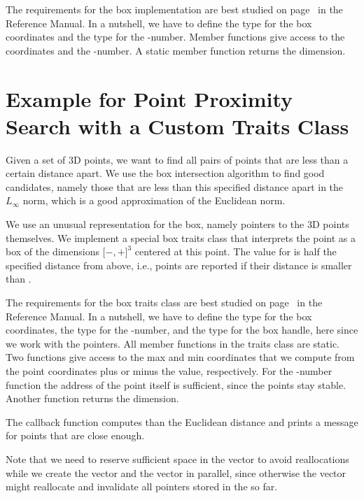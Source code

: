 The requirements for the box implementation are best studied on
page~ in the Reference Manual. In a
nutshell, we have to define the type  for the box coordinates
and the type  for the -number. Member functions
give access to the coordinates and the -number. A static
member function returns the dimension.



\section{Example for Point Proximity Search with a Custom Traits Class}
\label{sec:box_inters_example_proximity}

Given a set of 3D points, we want to find all pairs of points that are
less than a certain distance apart. We use the box intersection
algorithm to find good candidates, namely those that are less than
this specified distance apart in the $L_\infty$ norm, which is a good
approximation of the Euclidean norm.

We use an unusual representation for the box, namely pointers to the 3D points
themselves. We implement a special box traits class that interprets
the point as a box of the dimensions $[-$$,+$$]^3$
centered at this point. The value for  is half the specified distance
from above, i.e., points are reported if their distance is smaller
than .

The requirements for the box traits class are best studied on
page~ in the Reference Manual. In a
nutshell, we have to define the type  for the box coordinates,
the type  for the -number, and the type 
for the box handle, here  since we work with the pointers.
All member functions in the traits class are static. Two functions give
access to the max and min coordinates that we compute from the point
coordinates plus or minus the  value, respectively. For the
-number function the address of the point itself is
sufficient, since the points stay stable. Another function
returns the dimension.

The  callback function computes than the Euclidean
distance and prints a message for points that are close enough.

Note that we need to reserve sufficient space in the 
vector to avoid reallocations while we create the  vector
and the  vector in parallel, since otherwise the
 vector might reallocate and invalidate all pointers
stored in the  so far.


